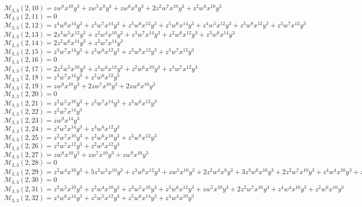 $\mathcal{M}_{3,3}(2,10)=zw^8x^{10}y^3+zw^5x^8y^3+zw^6x^8y^3+2z^2w^7x^{10}y^3+z^2w^6x^{10}y^3$\\
$\mathcal{M}_{3,3}(2,11)=0$\\
$\mathcal{M}_{3,3}(2,12)=z^4w^6x^{14}y^3+z^3w^7x^{14}y^3+z^3w^6x^{12}y^3+z^5w^6x^{14}y^3+z^4w^5x^{12}y^3+z^3w^8x^{12}y^3+z^3w^7x^{12}y^3$\\
$\mathcal{M}_{3,3}(2,13)=2z^3w^5x^{12}y^3+z^2w^4x^{10}y^3+z^3w^7x^{14}y^3+z^2w^6x^{12}y^3+z^3w^6x^{14}y^3$\\
$\mathcal{M}_{3,3}(2,14)=2z^2w^6x^{14}y^3+z^2w^7x^{14}y^3$\\
$\mathcal{M}_{3,3}(2,15)=z^3w^7x^{14}y^3+z^3w^6x^{12}y^3+z^3w^8x^{12}y^3+z^3w^7x^{12}y^3$\\
$\mathcal{M}_{3,3}(2,16)=0$\\
$\mathcal{M}_{3,3}(2,17)=2z^2w^5x^{10}y^3+z^3w^6x^{12}y^3+z^2w^6x^{10}y^3+z^3w^7x^{12}y^3$\\
$\mathcal{M}_{3,3}(2,18)=z^3w^7x^{14}y^3+z^2w^6x^{12}y^3$\\
$\mathcal{M}_{3,3}(2,19)=zw^8x^{10}y^3+2zw^7x^{10}y^3+2zw^6x^{10}y^3$\\
$\mathcal{M}_{3,3}(2,20)=0$\\
$\mathcal{M}_{3,3}(2,21)=z^2w^5x^{10}y^3+z^3w^7x^{14}y^3+z^3w^6x^{12}y^3$\\
$\mathcal{M}_{3,3}(2,22)=z^2w^7x^{14}y^3$\\
$\mathcal{M}_{3,3}(2,23)=zw^8x^{14}y^3$\\
$\mathcal{M}_{3,3}(2,24)=z^4w^7x^{14}y^3+z^3w^6x^{12}y^3$\\
$\mathcal{M}_{3,3}(2,25)=z^2w^7x^{10}y^3+z^2w^6x^{10}y^3+z^3w^8x^{12}y^3$\\
$\mathcal{M}_{3,3}(2,26)=z^2w^7x^{12}y^3+z^2w^8x^{12}y^3$\\
$\mathcal{M}_{3,3}(2,27)=zw^8x^{10}y^3+zw^7x^{10}y^3+zw^9x^{10}y^3$\\
$\mathcal{M}_{3,3}(2,28)=0$\\
$\mathcal{M}_{3,3}(2,29)=z^2w^4x^{10}y^3+5z^3w^5x^{10}y^3+z^3w^6x^{12}y^3+zw^5x^{10}y^3+2z^2w^4x^8y^3+3z^3w^6x^{10}y^3+2z^2w^7x^{10}y^3+z^4w^4x^{10}y^3+z^2w^5x^8y^3$\\
$\mathcal{M}_{3,3}(2,30)=0$\\
$\mathcal{M}_{3,3}(2,31)=z^2w^5x^{10}y^3+z^2w^4x^{10}y^3+z^3w^5x^{10}y^3+z^3w^6x^{12}y^3+zw^5x^{10}y^3+2z^2w^7x^{10}y^3+z^4w^4x^{10}y^3+z^2w^6x^{10}y^3$\\
$\mathcal{M}_{3,3}(2,32)=z^4w^6x^{14}y^3+z^5w^5x^{12}y^3+z^5w^6x^{14}y^3+z^4w^4x^{10}y^3$\\
